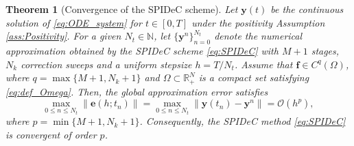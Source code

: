 \documentclass[a4paper,num-refs]{oup-contemporary-spidec}
\newtheorem{theorem}{Theorem}[section]
\begin{document}
\begin{theorem}[Convergence of the SPIDeC scheme]\label{thm:Convergence_SPIDeC}
Let $\bm{y}(t)$ be the continuous solution of \eqref{eq:ODE_system} for $t \in [0,T]$ under the positivity Assumption \ref{ass:Positivity}. For a given $N_t \in \mathbb{N}$, let $\{\bm{y}^n\}_{n=0}^{N_t}$ denote the numerical approximation obtained by the SPIDeC scheme \eqref{eq:SPIDeC} with $M+1$ stages, $N_k$ correction sweeps and a uniform stepsize $h = T/N_t$. Assume that $\bm{f} \in C^q(\Omega)$, where $q = \max\{M+1, N_k+1\}$ and $\Omega \subset \mathbb{R}^N_+$ is a compact set satisfying \eqref{eq:def_Omega}.
Then, the global approximation error satisfies
\begin{equation*}
    \max_{0 \leq n \leq N_t} \|\bm{e}(h; t_n)\| = \max_{0 \leq n \leq N_t} \|\bm{y}(t_n) - \bm{y}^n\| = \mathcal{O}(h^p),
\end{equation*}
where $p = \min\{M+1, N_k+1\}$. Consequently, the SPIDeC method \eqref{eq:SPIDeC} is convergent of order $p$.
\end{theorem}
\end{document}
